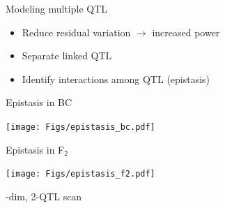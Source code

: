\documentclass[12pt]{article}
\newcommand{\headsize}{\fontsize{35}{35} \selectfont}
\newcommand{\smallsize}{\fontsize{25}{30} \selectfont}
\begin{document}
\newpage

\headsize \color{myyellow}
\hfill \begin{minipage}{5.75in}
\centering
Modeling multiple QTL 
\end{minipage}

\vspace{3cm}

\color{mywhite} \smallsize

\hfill \begin{minipage}[t]{10in}
\begin{itemize}
\itemsep24pt
\item Reduce residual variation $\longrightarrow$ increased power
   
\item Separate linked QTL

\item Identify interactions among QTL {\color{myblue} (epistasis)}

\end{itemize}
\end{minipage}


\newpage

\headsize \color{myyellow}
\hfill \begin{minipage}{5.75in}
\centering
Epistasis in BC
\end{minipage}

\vfill

\centerline{\texttt{[image: Figs/epistasis\_bc.pdf]}}


\newpage

\headsize \color{myyellow}
\hfill \begin{minipage}{5.75in}
\centering
Epistasis in F$_{\mathsf{2}}$
\end{minipage}

\vfill

\centerline{\texttt{[image: Figs/epistasis\_f2.pdf]}}



\newpage

\headsize \color{myyellow}
\hfill \begin{minipage}{5.75in}
-dim, 2-QTL scan 
\end{minipage}

\vspace{2cm}

\color{mywhite} \smallsize
\end{document}
